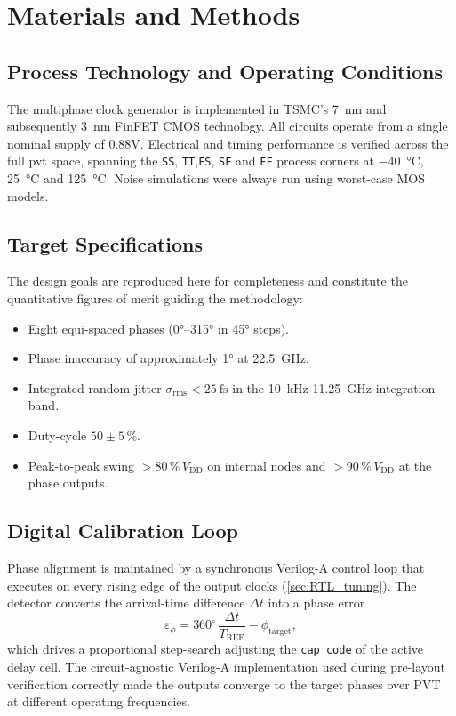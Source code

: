 \section{Materials and Methods}\label{sec:mat_methods}

\subsection{Process Technology and Operating Conditions}
The multiphase clock generator is implemented in TSMC's \SI{7}{\nano\metre} and subsequently \SI{3}{\nano\metre} FinFET CMOS technology.
All circuits operate from a single nominal supply of 0.88V.
Electrical and timing performance is verified across the full \gls{pvt} space, spanning the \texttt{SS}, \texttt{TT},\texttt{FS}, \texttt{SF} and \texttt{FF} process corners at \SI{-40}{\celsius}, \SI{25}{\celsius} and \SI{125}{\celsius}. 
Noise simulations were always run using worst-case MOS models.

\subsection{Target Specifications}
The design goals are reproduced here for completeness and constitute the quantitative figures of merit guiding the methodology:
\begin{itemize}
  \item Eight equi-spaced phases (0°--315° in 45° steps).
  \item Phase inaccuracy of approximately \ang{1} at \SI{22.5}{\giga\hertz}.
  \item Integrated random jitter $\sigma_\mathrm{rms}<\SI{25}{\femto\second}$ in the \SI{10}{\kilo\hertz}\--\SI{11.25}{\giga\hertz} integration band.
  \item Duty-cycle $50\pm5\,\%$.
  \item Peak-to-peak swing $>80\,\%\,V_\mathrm{DD}$ on internal nodes and $>90\,\%\,V_\mathrm{DD}$ at the phase outputs.
\end{itemize}

\subsection{Digital Calibration Loop}\label{sec:methods_digital_loop}
Phase alignment is maintained by a synchronous Verilog-A control loop that executes on every rising edge of the output clocks (\ref{sec:RTL_tuning}). 
The detector converts the arrival-time difference $\Delta t$ into a phase error 
\[
\varepsilon_\phi = 360^{\circ}\,\frac{\Delta t}{T_\mathrm{REF}} - \phi_\mathrm{target},
\]
which drives a proportional step-search adjusting the \texttt{cap\_code} of the active delay cell. 
The circuit-agnostic Verilog-A implementation used during pre-layout verification correctly made the outputs converge to the target phases over PVT at different operating frequencies.

